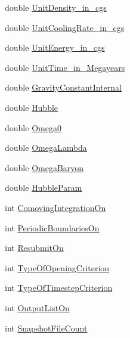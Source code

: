 \begin{DoxyCompactItemize}
\item 
double \hyperlink{structglobal__data__all__processes_aeccb92d371d0cfbd90cc34f85c8aa25f}{UnitDensity\_\-in\_\-cgs}
\item 
double \hyperlink{structglobal__data__all__processes_a79739025eb7e66065966227036437e06}{UnitCoolingRate\_\-in\_\-cgs}
\item 
double \hyperlink{structglobal__data__all__processes_ab0d48e2253ad31d76eda8e677eba2cf1}{UnitEnergy\_\-in\_\-cgs}
\item 
double \hyperlink{structglobal__data__all__processes_a833ed48234b2780d7a668ae90c84318e}{UnitTime\_\-in\_\-Megayears}
\item 
double \hyperlink{structglobal__data__all__processes_a3ebe48dc90c65aa0ed7ddfe8431987b1}{GravityConstantInternal}
\item 
double \hyperlink{structglobal__data__all__processes_a6e6a37250907d90a56f92a55aefdda5f}{Hubble}
\item 
double \hyperlink{structglobal__data__all__processes_abac5eca1b5851e670eec01d4dd47c417}{Omega0}
\item 
double \hyperlink{structglobal__data__all__processes_ae272abeafbcb16230374a903a3e4e298}{OmegaLambda}
\item 
double \hyperlink{structglobal__data__all__processes_a5656f8668fd420a86cb7372869745fee}{OmegaBaryon}
\item 
double \hyperlink{structglobal__data__all__processes_a51f2bde6feb49841d60397964a9740ac}{HubbleParam}
\item 
int \hyperlink{structglobal__data__all__processes_a4104c753df69fb4da0dd9bbb57e2a5f4}{ComovingIntegrationOn}
\item 
int \hyperlink{structglobal__data__all__processes_a52b027433ffad064869c606656e9bf7d}{PeriodicBoundariesOn}
\item 
int \hyperlink{structglobal__data__all__processes_a6578ce0ee08f770891c662c0ab4ad10c}{ResubmitOn}
\item 
int \hyperlink{structglobal__data__all__processes_a0c2a481de17eefbbd973fb8a7bb6f8fc}{TypeOfOpeningCriterion}
\item 
int \hyperlink{structglobal__data__all__processes_a2cc704c49ada031fae9619dbf163e32d}{TypeOfTimestepCriterion}
\item 
int \hyperlink{structglobal__data__all__processes_a4e9d69a3dd88c6aef6f4afd640243950}{OutputListOn}
\item 
int \hyperlink{structglobal__data__all__processes_aac0d3fcbac688a31e6bda55ef819c44b}{SnapshotFileCount}

\end{DoxyCompactItemize}
